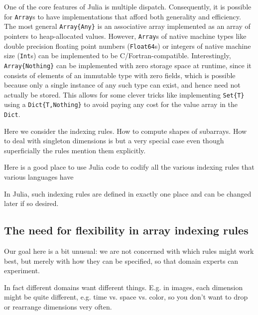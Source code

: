 \documentclass[preprint]{sigplanconf}
\newcommand{\code}[1]{\texttt{#1}}
\begin{document}
One of the core features of Julia is multiple dispatch. Consequently, it is
possible for \code{Array}s to have implementations that afford both generality
and efficiency. The most general \code{Array\{Any\}} is an associative array
implemented as an array of pointers to heap-allocated values. However,
\code{Array}s of native machine types like double precision floating point
numbers (\code{Float64}s) or integers of native machine size (\code{Int}s) can
be implemented to be C/Fortran-compatible. Interestingly,
\code{Array\{Nothing\}} can be implemented with zero storage space at runtime,
since it consists of elements of an immutable type with zero fields, which is
possible because only a single instance of any such type can exist, and hence
need not actually be stored. This allows for some clever tricks like
implementing \code{Set\{T\}} using a \code{Dict\{T,Nothing\}} to avoid paying
any cost for the value array in the \code{Dict}.



Here we consider the indexing rules. How to compute shapes of subarrays. How
to deal with singleton dimensions is but a very special case even though
superficially the rules mention them explicitly.

Here is a good place to use Julia code to codify all the various indexing
rules that various languages have

In Julia, such indexing rules are defined in exactly one place and can be
changed later if so desired.

\subsection{The need for flexibility in array indexing rules}

Our goal here is a bit unusual: we are not concerned with which rules might
work best, but merely with how they can be specified, so that domain experts
can experiment.

In fact different domains want different things. E.g. in images, each
dimension might be quite different, e.g. time vs. space vs. color, so you
don't want to drop or rearrange dimensions very often.
\end{document}
